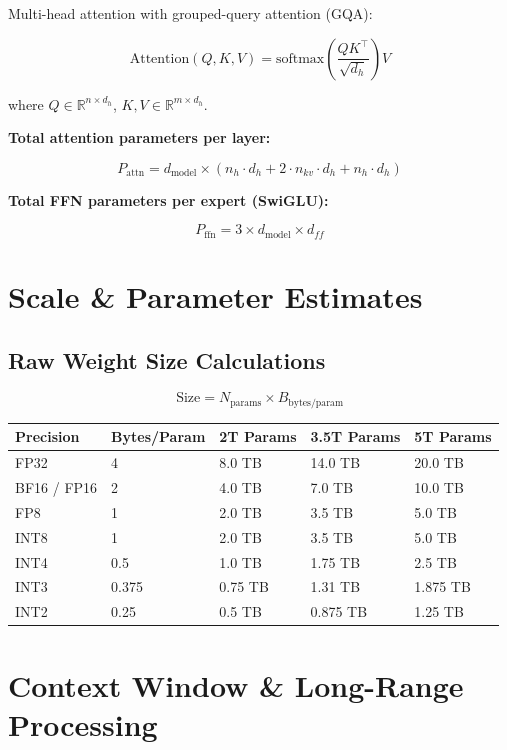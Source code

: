 \documentclass[11pt,a4paper]{article}
\begin{document}
Multi-head attention with grouped-query attention (GQA):

$$\text{Attention}(Q, K, V) = \text{softmax}\!\left(\frac{Q K^\top}{\sqrt{d_h}}\right) V$$

where $Q \in \mathbb{R}^{n \times d_h}$, $K, V \in \mathbb{R}^{m \times d_h}$.

\textbf{Total attention parameters per layer:}

$$P_{\text{attn}} = d_{\text{model}} \times (n_h \cdot d_h + 2 \cdot n_{kv} \cdot d_h + n_h \cdot d_h)$$

\textbf{Total FFN parameters per expert (SwiGLU):}

$$P_{\text{ffn}} = 3 \times d_{\text{model}} \times d_{ff}$$

\section{Scale \& Parameter Estimates}

\subsection{Raw Weight Size Calculations}

$$\text{Size} = N_{\text{params}} \times B_{\text{bytes/param}}$$

\begin{center}
\begin{tabular}{lllll}
\toprule
\textbf{Precision} & \textbf{Bytes/Param} & \textbf{2T Params} & \textbf{3.5T Params} & \textbf{5T Params} \\
\midrule
FP32 & 4 & 8.0 TB & 14.0 TB & 20.0 TB \\
BF16 / FP16 & 2 & 4.0 TB & 7.0 TB & 10.0 TB \\
FP8 & 1 & 2.0 TB & 3.5 TB & 5.0 TB \\
INT8 & 1 & 2.0 TB & 3.5 TB & 5.0 TB \\
INT4 & 0.5 & 1.0 TB & 1.75 TB & 2.5 TB \\
INT3 & 0.375 & 0.75 TB & 1.31 TB & 1.875 TB \\
INT2 & 0.25 & 0.5 TB & 0.875 TB & 1.25 TB \\
\bottomrule
\end{tabular}
\end{center}

\section{Context Window \& Long-Range Processing}
\end{document}
